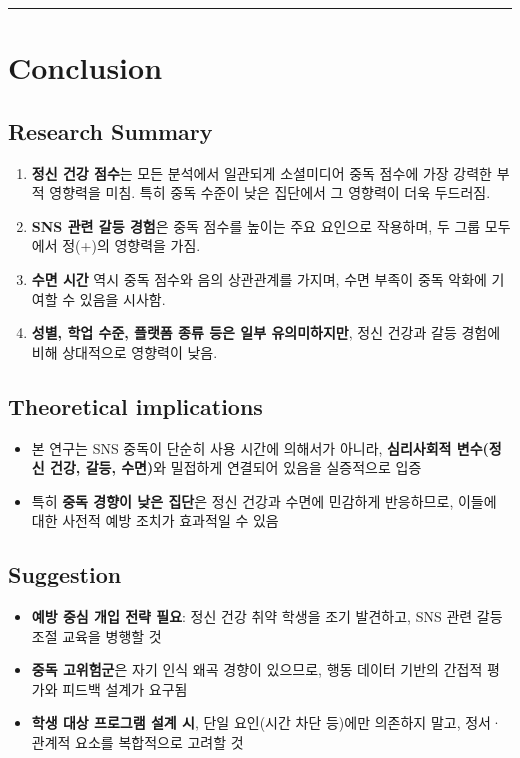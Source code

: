\documentclass[11pt]{article}
\providecommand{\tightlist}{%
      \setlength{\itemsep}{0pt}\setlength{\parskip}{0pt}}
\begin{document}
    \begin{center}\rule{0.5\linewidth}{0.5pt}\end{center}

\section{Conclusion}\label{conclusion}

\subsection{Research Summary}\label{research-summary}

\begin{enumerate}
\def\labelenumi{\arabic{enumi}.}
\tightlist
\item
  \textbf{정신 건강 점수}는 모든 분석에서 일관되게 소셜미디어 중독
  점수에 가장 강력한 부적 영향력을 미침. 특히 중독 수준이 낮은 집단에서
  그 영향력이 더욱 두드러짐.
\item
  \textbf{SNS 관련 갈등 경험}은 중독 점수를 높이는 주요 요인으로
  작용하며, 두 그룹 모두에서 정(+)의 영향력을 가짐.
\item
  \textbf{수면 시간} 역시 중독 점수와 음의 상관관계를 가지며, 수면
  부족이 중독 악화에 기여할 수 있음을 시사함.
\item
  \textbf{성별, 학업 수준, 플랫폼 종류 등은 일부 유의미하지만}, 정신
  건강과 갈등 경험에 비해 상대적으로 영향력이 낮음.
\end{enumerate}

\subsection{Theoretical implications}\label{theoretical-implications}

\begin{itemize}
\tightlist
\item
  본 연구는 SNS 중독이 단순히 사용 시간에 의해서가 아니라,
  \textbf{심리사회적 변수(정신 건강, 갈등, 수면)}와 밀접하게 연결되어
  있음을 실증적으로 입증
\item
  특히 \textbf{중독 경향이 낮은 집단}은 정신 건강과 수면에 민감하게
  반응하므로, 이들에 대한 사전적 예방 조치가 효과적일 수 있음
\end{itemize}

\subsection{Suggestion}\label{suggestion}

\begin{itemize}
\tightlist
\item
  \textbf{예방 중심 개입 전략 필요}: 정신 건강 취약 학생을 조기
  발견하고, SNS 관련 갈등 조절 교육을 병행할 것
\item
  \textbf{중독 고위험군}은 자기 인식 왜곡 경향이 있으므로, 행동 데이터
  기반의 간접적 평가와 피드백 설계가 요구됨
\item
  \textbf{학생 대상 프로그램 설계 시}, 단일 요인(시간 차단 등)에만
  의존하지 말고, 정서·관계적 요소를 복합적으로 고려할 것
\end{itemize}


    
    
    
\end{document}
